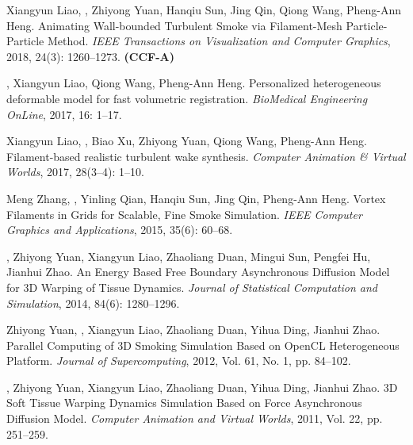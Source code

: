 \documentclass[a4paper,12pt,english]{curve}
\begin{document}
\begin{small}
\begin{publist}
\item Xiangyun Liao\COF, \WS\COF, Zhiyong Yuan\CORR, Hanqiu Sun, Jing Qin, Qiong Wang\CORR, Pheng-Ann Heng. Animating Wall-bounded Turbulent Smoke via Filament-Mesh Particle-Particle Method. \emph{IEEE Transactions on Visualization and Computer Graphics}, 2018, 24(3): 1260--1273. \textbf{(CCF-A)}
\item \WS\COF, Xiangyun Liao\COF, Qiong Wang\CORR, Pheng-Ann Heng. Personalized heterogeneous deformable model for fast volumetric registration. \emph{BioMedical Engineering OnLine}, 2017, 16: 1--17.
\item Xiangyun Liao\COF, \WS\COF, Biao Xu, Zhiyong Yuan\CORR, Qiong Wang, Pheng-Ann Heng. Filament-based realistic turbulent wake synthesis. \emph{Computer Animation \& Virtual Worlds}, 2017, 28(3--4): 1--10.
\item Meng Zhang, \WS\CORR, Yinling Qian, Hanqiu Sun\CORR, Jing Qin, Pheng-Ann Heng. Vortex Filaments in Grids for Scalable, Fine Smoke Simulation. \emph{IEEE Computer Graphics and Applications}, 2015, 35(6): 60--68.
\item \WS, Zhiyong Yuan\CORR, Xiangyun Liao, Zhaoliang Duan, Mingui Sun, Pengfei Hu, Jianhui Zhao. An Energy Based Free Boundary Asynchronous Diffusion Model for 3D Warping of Tissue Dynamics. \emph{Journal of Statistical Computation and Simulation}, 2014, 84(6): 1280--1296.
\item Zhiyong Yuan\CORR, \WS, Xiangyun Liao, Zhaoliang Duan, Yihua Ding, Jianhui Zhao. Parallel Computing of 3D Smoking Simulation Based on OpenCL Heterogeneous Platform. \emph{Journal of Supercomputing}, 2012, Vol. 61, No. 1, pp. 84--102.
\item \WS, Zhiyong Yuan\CORR, Xiangyun Liao, Zhaoliang Duan, Yihua Ding, Jianhui Zhao. 3D Soft Tissue Warping Dynamics Simulation Based on Force Asynchronous Diffusion Model. \emph{Computer Animation and Virtual Worlds}, 2011, Vol. 22, pp. 251--259.
\end{publist}
\end{small}
\end{document}
